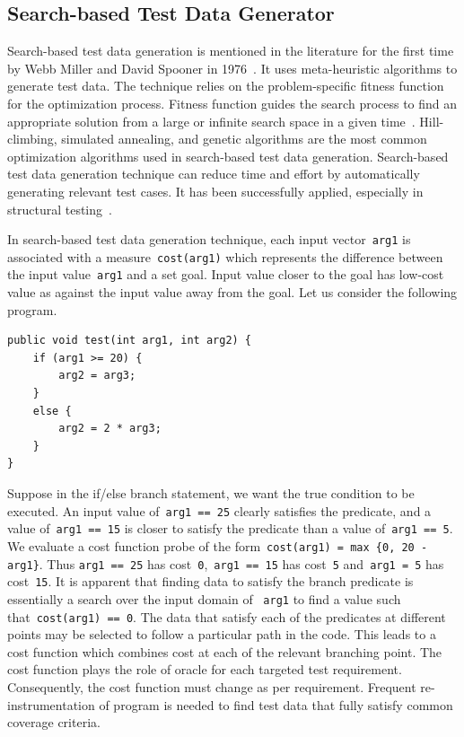 
\subsection{Search-based Test Data Generator} \label{sec:search_based_2}
Search-based test data generation is mentioned in the literature for the first time by Webb Miller and David Spooner in 1976~\cite{miller1976automatic}. It uses meta-heuristic algorithms to generate test data. The technique relies on the problem-specific fitness function for the optimization process. Fitness function guides the search process to find an appropriate solution from a large or infinite search space in a given time~\cite{mcminn2011search}. Hill-climbing, simulated annealing, and genetic algorithms are the most common optimization algorithms used in search-based test data generation. Search-based test data generation technique can reduce time and effort by automatically generating relevant test cases. It has been successfully applied, especially in structural testing~\cite{mcminn2011search, jones1996automatic}.

In search-based test data generation technique, each input vector~\verb+arg1+ is associated with a measure~\verb+cost(arg1)+ which represents the difference between the input value~\verb+arg1+ and a set goal. Input value closer to the goal has low-cost value as against the input value away from the goal. 
Let us consider the following program.

\bigskip
\begin{lstlisting}
public void test(int arg1, int arg2) {
	if (arg1 >= 20) {
		arg2 = arg3; 
	}
	else {
		arg2 = 2 * arg3;
	}
}
\end{lstlisting}
\bigskip

Suppose in the if/else branch statement, we want the true condition to be executed. An input value of~\verb+arg1 == 25+ clearly satisfies the predicate, and a value of~\verb+arg1 == 15+ is closer to satisfy the predicate than a value of~\verb+arg1 == 5+. We evaluate a cost function probe of the form~\verb+cost(arg1) = max {0, 20 - arg1}+. Thus \verb+arg1 == 25+ has cost~\verb+0+,~\verb+arg1 == 15+ has cost~\verb+5+ and~\verb+arg1 = 5+ has cost~\verb+15+. It is apparent that finding data to satisfy the branch predicate is essentially a search over the input domain of ~\verb+arg1+ to find a value such that~\verb+cost(arg1) == 0+. The data that satisfy each of the predicates at different points may be selected to follow a particular path in the code. This leads to a cost function which combines cost at each of the relevant branching point. The cost function plays the role of oracle for each targeted test requirement. Consequently, the cost function must change as per requirement. Frequent re-instrumentation of program is needed to find test data that fully satisfy common coverage criteria. 



